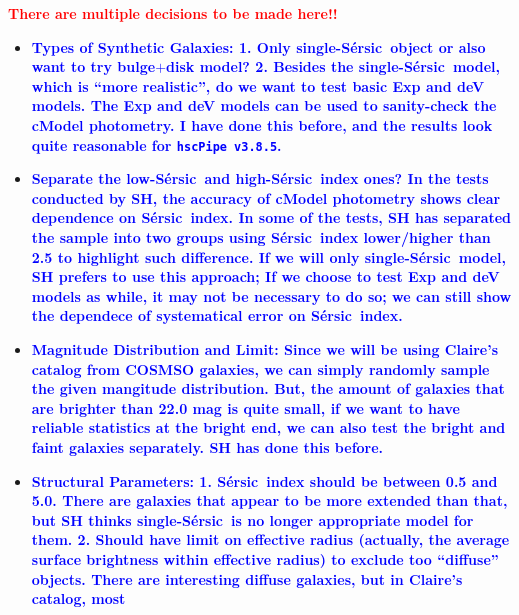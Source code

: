 \documentclass{pasj01}
\def\ser{{S\'{e}rsic\ }}
\newcommand{\plan}[1]{\textcolor{blue} {\textbf{#1}}}
\newcommand{\todo}[1]{\textcolor{red} {\textbf{#1}}}
\begin{document}
    \todo{\textbf{There are multiple decisions to be made here!!}}
    \begin{itemize}
        \item \plan{\textbf{Types of Synthetic Galaxies}:
                    1. Only single-\ser object or also want to try bulge$+$disk model? 
                    2. Besides the single-\ser model, which is ``more realistic'', do 
                       we want to test basic Exp and deV models.  
                       The Exp and deV models can be used to sanity-check the cModel 
                       photometry.  I have done this before, and the results look quite 
                       reasonable for \texttt{hscPipe\ v3.8.5}.}
        \item \plan{\textbf{Separate the low-\ser and high-\ser index ones?}
                    In the tests conducted by SH, the accuracy of cModel photometry shows
                    clear dependence on \ser index.  
                    In some of the tests, SH has separated the sample into two groups using
                    \ser index lower/higher than 2.5 to highlight such difference. 
                    If we will only single-\ser model, SH prefers to use this approach; 
                    If we choose to test Exp and deV models as while, it may not be necessary 
                    to do so; we can still show the dependece of systematical error on 
                    \ser index.}
        \item \plan{\textbf{Magnitude Distribution and Limit}:
                    Since we will be using Claire's catalog from COSMSO galaxies, we can 
                    simply randomly sample the given mangitude distribution.  
                    But, the amount of galaxies that are brighter than 22.0 mag is quite small, 
                    if we want to have reliable statistics at the bright end, we can also 
                    test the bright and faint galaxies separately.  SH has done this before. 
                   }
        \item \plan{\textbf{Structural Parameters}:
                    1. \ser index should be between 0.5 and 5.0.  
                       There are galaxies that appear to be more extended than that, 
                       but SH thinks single-\ser is no longer appropriate model for them.
                    2. Should have limit on effective radius (actually, the average surface 
                       brightness within effective radius) to exclude too ``diffuse'' objects.  
                       There are interesting diffuse galaxies, but in Claire's catalog, most 
}
\end{itemize}
\end{document}
